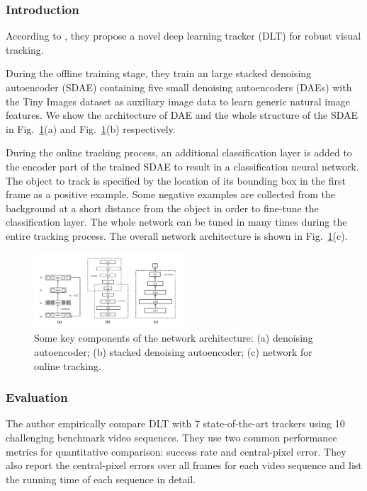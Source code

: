 \documentclass{acm_proc_article-sp}
\begin{document}
\subsubsection{Introduction}
According to \cite{dlt}, they propose a novel deep learning tracker (DLT) for robust visual tracking.

During the offline training stage, they train an large stacked denoising autoencoder (SDAE) containing five small denoising autoencoders (DAEs) with the Tiny Images dataset \cite{tiny} as auxiliary image data to learn generic natural image features.
We show the architecture of DAE and the whole structure of the SDAE in Fig.~\ref{fig:dlt}(a) and Fig.~\ref{fig:dlt}(b) respectively.

During the online tracking process, an additional classification layer is added to the encoder part of the trained SDAE to result in a classification neural network.
The object to track is specified by the location of its bounding box in the first frame as a positive example.
Some negative examples are collected from the background at a short distance from the object in order to fine-tune the classification layer.
The whole network can be tuned in many times during the entire tracking process.
The overall network architecture is shown in Fig.~\ref{fig:dlt}(c).

\begin{center}
    \begin{figure}[hbt]
      \includegraphics[width=0.5\textwidth]{dlt.png}
      \caption{Some key components of the network architecture: (a) denoising autoencoder; (b) stacked denoising autoencoder; (c) network for online tracking.}
      \label{fig:dlt}
    \end{figure}
\end{center}

\subsubsection{Evaluation}

The author empirically compare DLT with 7 state-of-the-art trackers using 10 challenging benchmark video sequences. They use two common performance metrics for quantitative comparison: success rate and central-pixel error. They also report the central-pixel errors over all frames for each video sequence and list the running time of each sequence in detail.
\end{document}
